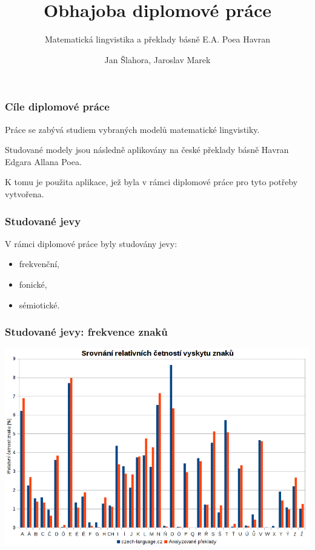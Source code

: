 \documentclass[12pt,xcolor=usenames,dvipsnames]{beamer}
\author[Jan Šlahora]{Jan Šlahora, Jaroslav Marek}
\title{Obhajoba diplomové práce}
\subtitle{Matematická lingvistika a překlady básně E.A. Poea Havran}
\institute[FEI UPCE]{Fakulta elektrotechniky a informatiky\\Univerzita Pardubice} %
\begin{document}
\frame{\titlepage}

\begin{frame}
	\frametitle{Cíle diplomové práce}

	Práce se zabývá studiem vybraných modelů matematické lingvistiky.
	
	Studované modely jsou následně aplikovány na české překlady básně Havran Edgara Allana Poea.

	K tomu je použita aplikace, jež byla v rámci diplomové práce pro tyto potřeby vytvořena.
\end{frame}

\begin{frame}
	\frametitle{Studované jevy}

	V rámci diplomové práce byly studovány jevy:
	
	\begin{itemize}
		\item frekvenční,
		\item fonické,
		\item sémiotické.
	\end{itemize}
\end{frame}

\begin{frame}
	\frametitle{Studované jevy: frekvence znaků}
	
	\vspace{-8.8pt}
	\begin{center}
		\includegraphics[width=\linewidth,height=0.86\textheight,keepaspectratio]{cetnost-znaku}
	\end{center}

\end{frame}
\end{document}
